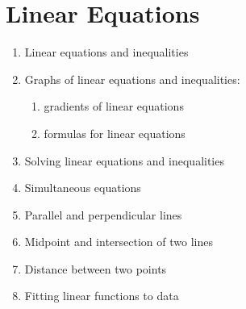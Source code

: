 
\chapter{Linear Equations}

\begin{enumerate}
\item Linear equations and inequalities

\item Graphs of linear equations and inequalities:
  \begin{enumerate}
  \item gradients of linear equations

  \item formulas for linear equations
  \end{enumerate}

\item Solving linear equations and inequalities

\item Simultaneous equations

\item Parallel and perpendicular lines

\item Midpoint and intersection of two lines

\item Distance between two points

\item Fitting linear functions to data
\end{enumerate}
